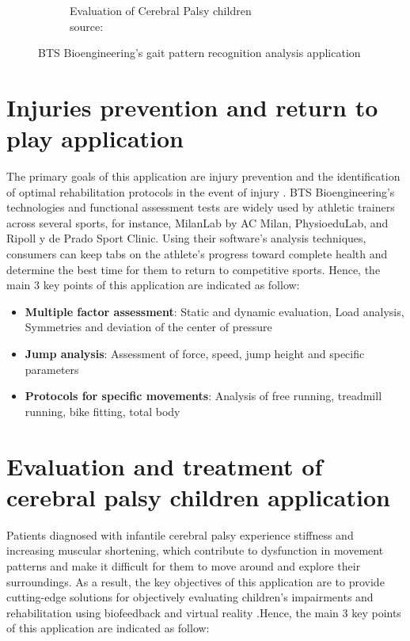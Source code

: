 \begin{figure}[h]
\begin{subfigure}[b]{0.49\textwidth}
         \captionsetup{justification=centering}
         \caption{Evaluation of Cerebral Palsy children \\ source: \cite{BTS_Carebral_palsy2022}}
         \label{fig:Evaluation and treatment of Cerebral Palsy children}
     \end{subfigure}
        \caption{BTS Bioengineering’s gait pattern recognition analysis application}
        \label{fig:BTS Bioengineering’s gait pattern recognition analysis application}
\end{figure}

\section{Injuries prevention and return to play application}

\noindent The primary goals of this application are injury prevention and the identification of optimal rehabilitation protocols in the event of injury \cite{BTS_Injury_prevention2022}. BTS Bioengineering's technologies and functional assessment tests are widely used by athletic trainers across several sports, for instance, MilanLab by AC Milan, PhysioeduLab, and Ripoll y de Prado Sport Clinic. Using their software's analysis techniques, consumers can keep tabs on the athlete's progress toward complete health and determine the best time for them to return to competitive sports. Hence, the main 3 key points of this application are indicated as follow:

\bigskip

\begin{itemize}
\item \textbf{Multiple factor assessment}:
Static and dynamic evaluation, Load analysis, Symmetries and deviation of the center of pressure
\item \textbf{Jump analysis}:
Assessment of force, speed, jump height and specific parameters
\item \textbf{Protocols for specific movements}:
Analysis of free running, treadmill running, bike fitting, total body
\end{itemize}

\section{Evaluation and treatment of cerebral palsy children application}

\noindent Patients diagnosed with infantile cerebral palsy experience stiffness and increasing muscular shortening, which contribute to dysfunction in movement patterns and make it difficult for them to move around and explore their surroundings. As a result, the key objectives of this application are to provide cutting-edge solutions for objectively evaluating children's impairments and rehabilitation using biofeedback and virtual reality \cite{BTS_Carebral_palsy2022}.Hence, the main 3 key points of this application are indicated as follow:

